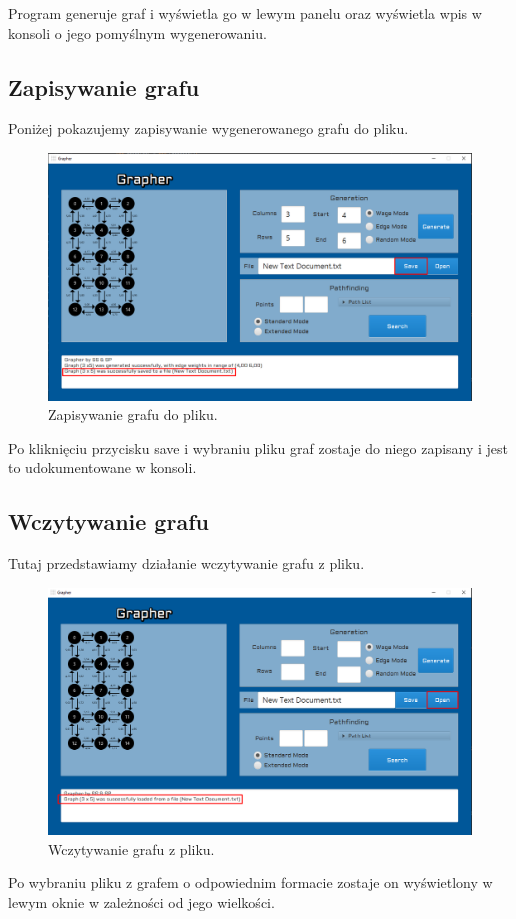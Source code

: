 \documentclass[10pt, a4paper]{report}
\begin{document}
Program generuje graf i wyświetla go w lewym panelu oraz wyświetla wpis w konsoli o jego pomyślnym wygenerowaniu.
\newpage

\subsection{Zapisywanie grafu}\label{subsec:zapisywanie}
Poniżej pokazujemy zapisywanie wygenerowanego grafu do pliku.

\begin{figure}[h]
  \begin{center}
    \includegraphics[scale=0.4]{saving.png}
    \caption{Zapisywanie grafu do pliku.}
  \end{center}
\end{figure}
Po kliknięciu przycisku save i wybraniu pliku graf zostaje do niego zapisany i jest to udokumentowane w konsoli.
\newpage

\subsection{Wczytywanie grafu}\label{subsec:wczytywanie}
Tutaj przedstawiamy działanie wczytywanie grafu z pliku.

\begin{figure}[h]
  \begin{center}
    \includegraphics[scale=0.4]{loading.png}
    \caption{Wczytywanie grafu z pliku.}
  \end{center}
\end{figure}
Po wybraniu pliku z grafem o odpowiednim formacie zostaje on wyświetlony w lewym oknie w zależności od jego wielkości.
\end{document}

